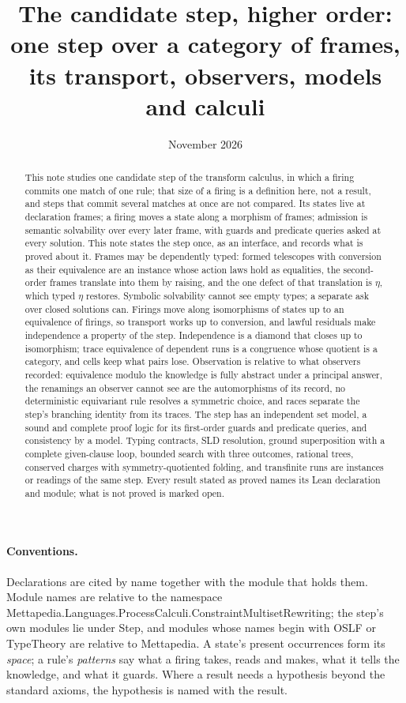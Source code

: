 \documentclass[11pt]{article}
\title{The candidate step, higher order:\\ one step over a category of frames,\\ its transport, observers, models and calculi}
\date{November 2026}
\author{}
\theoremstyle{remark}
\newcommand{\lean}[1]{{\ttfamily\def\_{\textunderscore\allowbreak}#1}}
\begin{document}
\sloppy
\maketitle

\begin{abstract}
This note studies one candidate step of the transform calculus, in which a firing commits one match
of one rule; that size of a firing is a definition here, not a result, and steps that commit several
matches at once are not compared. Its states live at declaration frames; a firing moves
a state along a morphism of frames; admission is semantic solvability over every later frame, with
guards and predicate queries asked at every solution. This note states the step once, as an
interface, and records what is proved about it. Frames may be dependently typed: formed telescopes
with conversion as their equivalence are an instance whose action laws hold as equalities, the
second-order frames translate into them by raising, and the one defect of that translation is
$\eta$, which typed $\eta$ restores. Symbolic solvability cannot see empty types; a separate ask over
closed solutions can. Firings move along isomorphisms of states up to an equivalence of firings, so
transport works up to conversion, and lawful residuals make independence a property of the step.
Independence is a diamond that closes up to isomorphism; trace equivalence of dependent runs is a
congruence whose quotient is a category, and cells keep what pairs lose. Observation is relative to
what observers recorded: equivalence modulo the knowledge is fully abstract under a principal
answer, the renamings an observer cannot see are the automorphisms of its record, no deterministic
equivariant rule resolves a symmetric choice, and races separate the step's branching identity from
its traces. The step has an independent set model, a sound and complete proof logic for its
first-order guards and predicate queries, and consistency by a model. Typing contracts, SLD
resolution, ground superposition with a complete given-clause loop, bounded search with three
outcomes, rational trees, conserved charges with symmetry-quotiented folding, and transfinite runs
are instances or readings of the same step. Every result stated as proved names its Lean declaration
and module; what is not proved is marked open.
\end{abstract}

\begingroup\raggedright
\paragraph{Conventions.} Declarations are cited by name together with the module that holds them.
Module names are relative to the namespace
\lean{Mettapedia.Languages.ProcessCalculi.\allowbreak ConstraintMultisetRewriting}; the step's own
modules lie under \lean{Step}, and modules whose names begin with \lean{OSLF} or \lean{TypeTheory} are
relative to \lean{Mettapedia}. A state's present occurrences form its \emph{space}; a rule's
\emph{patterns} say what a firing takes, reads and makes, what it tells the knowledge, and what it
guards. Where a result needs a hypothesis beyond the standard axioms, the hypothesis is named with the
result.\par
\endgroup
\end{document}
